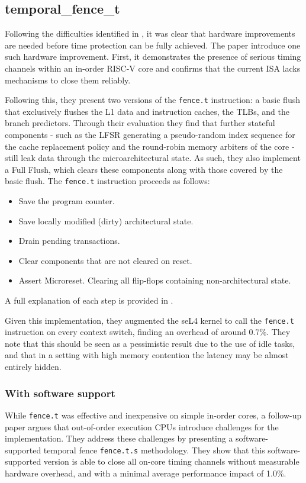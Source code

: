 \subsection{temporal\_fence\_t}\label{sub:temporal} %
Following the difficulties identified in \cite{ge2019}, it was clear that
hardware improvements are needed before time protection can be fully achieved.
The paper \cite{wistoff2023} introduce one such hardware improvement. First, it
demonstrates the presence of serious timing channels within an in-order RISC-V
core and confirms that the current ISA lacks mechanisms to close them reliably.

Following this, they present two versions of the \texttt{fence.t} instruction:
a basic flush that exclusively flushes the L1 data and instruction caches, the
TLBs, and the branch predictors. Through their evaluation they find that
further stateful components - such as the LFSR generating a pseudo-random index
sequence for the cache replacement policy and the round-robin memory arbiters
of the core - still leak data through the microarchitectural state. As such,
they also implement a Full Flush, which clears these components along with
those covered by the basic flush. The \texttt{fence.t} instruction proceeds as
follows:
\begin{itemize}
  \item Save the program counter.
  \item Save locally modified (dirty) architectural state.
  \item Drain pending transactions.
  \item Clear components that are not cleared on reset.
  \item Assert Microreset. Clearing all flip-flops containing non-architectural
    state.
\end{itemize}

A full explanation of each step is provided in \cite{wistoff2023}.

Given this implementation, they augmented the seL4 kernel to call the
\texttt{fence.t} instruction on every context switch, finding an overhead of
around 0.7\%. They note that this should be seen as a pessimistic result due to
the use of idle tasks, and that in a setting with high memory contention the
latency may be almost entirely hidden.

\subsubsection{With software support}
While \texttt{fence.t} was effective and inexpensive on simple in-order cores,
a follow-up paper \cite{wistoff2025} argues that out-of-order execution CPUs
introduce challenges for the implementation. They address these challenges by
presenting a software-supported temporal fence \texttt{fence.t.s} methodology.
They show that this software-supported version is able to close all on-core
timing channels without measurable hardware overhead, and with a minimal
average performance impact of 1.0\%.


